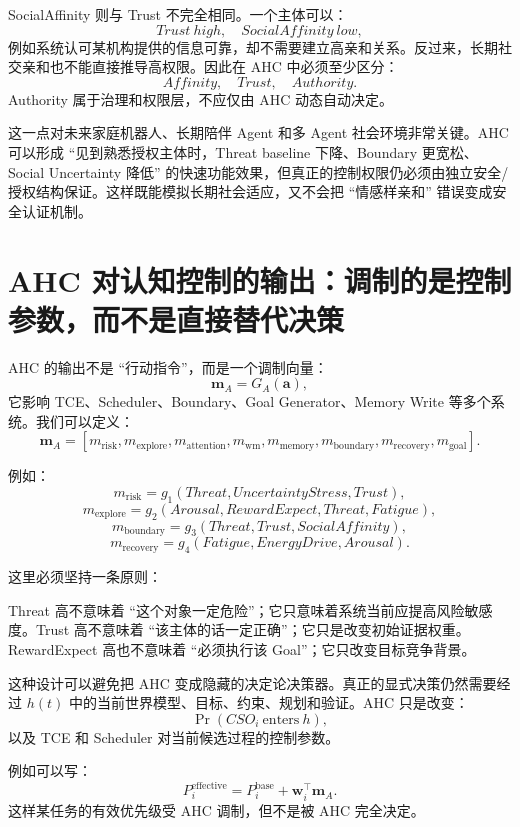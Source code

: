 SocialAffinity 则与 Trust 不完全相同。一个主体可以：
\[
Trust\ high,\quad
SocialAffinity\ low,
\]
例如系统认可某机构提供的信息可靠，却不需要建立高亲和关系。反过来，长期社交亲和也不能直接推导高权限。因此在 AHC 中必须至少区分：
\[
Affinity,
\quad
Trust,
\quad
Authority.
\]
Authority 属于治理和权限层，不应仅由 AHC 动态自动决定。

这一点对未来家庭机器人、长期陪伴 Agent 和多 Agent 社会环境非常关键。AHC 可以形成 ``见到熟悉授权主体时，Threat baseline 下降、Boundary 更宽松、Social Uncertainty 降低'' 的快速功能效果，但真正的控制权限仍必须由独立安全/授权结构保证。这样既能模拟长期社会适应，又不会把 ``情感样亲和'' 错误变成安全认证机制。


\section{AHC 对认知控制的输出：调制的是控制参数，而不是直接替代决策}

AHC 的输出不是 ``行动指令''，而是一个调制向量：
\[
\mathbf m_A
=
G_A(\mathbf a),
\]
它影响 TCE、Scheduler、Boundary、Goal Generator、Memory Write 等多个系统。我们可以定义：
\[
\mathbf m_A
=
[
m_{\mathrm{risk}},
m_{\mathrm{explore}},
m_{\mathrm{attention}},
m_{\mathrm{wm}},
m_{\mathrm{memory}},
m_{\mathrm{boundary}},
m_{\mathrm{recovery}},
m_{\mathrm{goal}}
].
\]

例如：
\[
m_{\mathrm{risk}}
=
g_1(
Threat,
UncertaintyStress,
Trust
),
\]
\[
m_{\mathrm{explore}}
=
g_2(
Arousal,
RewardExpect,
Threat,
Fatigue
),
\]
\[
m_{\mathrm{boundary}}
=
g_3(
Threat,
Trust,
SocialAffinity
),
\]
\[
m_{\mathrm{recovery}}
=
g_4(
Fatigue,
EnergyDrive,
Arousal
).
\]

这里必须坚持一条原则：
\begin{statementbox}
\centering
{}
\end{statementbox}
Threat 高不意味着 ``这个对象一定危险''；它只意味着系统当前应提高风险敏感度。Trust 高不意味着 ``该主体的话一定正确''；它只是改变初始证据权重。RewardExpect 高也不意味着 ``必须执行该 Goal''；它只改变目标竞争背景。

这种设计可以避免把 AHC 变成隐藏的决定论决策器。真正的显式决策仍然需要经过 $h(t)$ 中的当前世界模型、目标、约束、规划和验证。AHC 只是改变：
\[
\Pr(
CSO_i\ \mathrm{enters}\ h
),
\]
以及 TCE 和 Scheduler 对当前候选过程的控制参数。

例如可以写：
\[
P_i^{\mathrm{effective}}
=
P_i^{\mathrm{base}}
+
\mathbf w_i^\top
\mathbf m_A.
\]
这样某任务的有效优先级受 AHC 调制，但不是被 AHC 完全决定。

